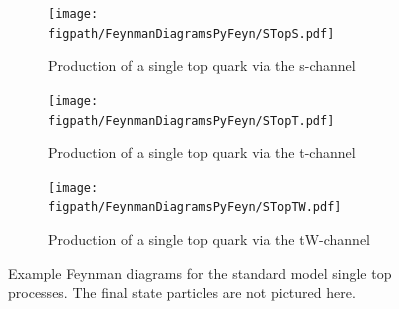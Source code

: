 \begin{figure}[!hbt]
  \centering
  \begin{subfigure}[t]{0.3\textwidth}
    \texttt{[image: \\figpath/FeynmanDiagramsPyFeyn/STopS.pdf]}
    \caption{Production of a single top quark via the s-channel}
    \label{fig:STopS}
  \end{subfigure}
  \hspace{0.015\textwidth}
  \begin{subfigure}[t]{0.3\textwidth}
    \texttt{[image: \\figpath/FeynmanDiagramsPyFeyn/STopT.pdf]}
    \caption{Production of a single top quark via the t-channel}
    \label{fig:STopT}
  \end{subfigure}
  \hspace{0.015\textwidth}
  \begin{subfigure}[t]{0.3\textwidth}
    \texttt{[image: \\figpath/FeynmanDiagramsPyFeyn/STopTW.pdf]}
    \caption{Production of a single top quark via the tW-channel}
    \label{fig:STopTW}
  \end{subfigure}
  \caption{Example Feynman diagrams for the standard model single top processes. The final state particles are not pictured here.}
  \label{fig:SingleTopBackground}
\end{figure}

